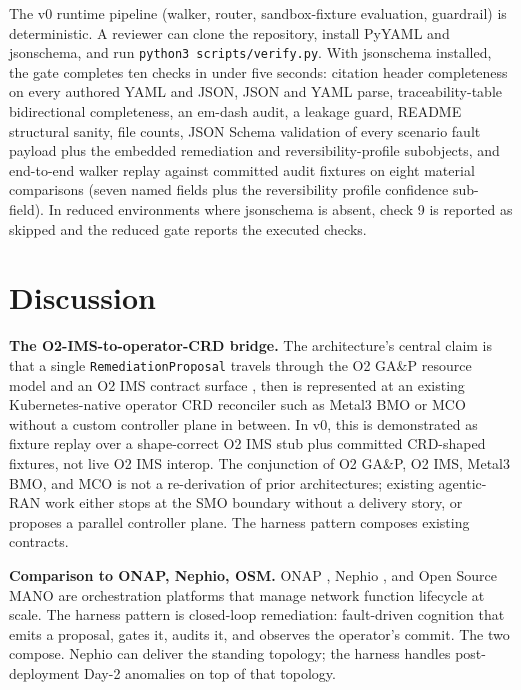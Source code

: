 \documentclass[twocolumn,10pt,a4paper]{article}
\begin{document}
The v0 runtime pipeline (walker, router, sandbox-fixture evaluation, guardrail) is deterministic. A reviewer can clone the repository, install PyYAML and jsonschema, and run \texttt{python3 scripts/verify.py}. With jsonschema installed, the gate completes ten checks in under five seconds: citation header completeness on every authored YAML and JSON, JSON and YAML parse, traceability-table bidirectional completeness, an em-dash audit, a leakage guard, README structural sanity, file counts, JSON Schema validation of every scenario fault payload plus the embedded remediation and reversibility-profile subobjects, and end-to-end walker replay against committed audit fixtures on eight material comparisons (seven named fields plus the reversibility profile confidence sub-field). In reduced environments where jsonschema is absent, check 9 is reported as skipped and the reduced gate reports the executed checks.

\section{Discussion}
\label{sec:discuss}

\textbf{The O2-IMS-to-operator-CRD bridge.} The architecture's central claim is that a single \texttt{RemediationProposal} travels through the O2 GA\&P resource model and an O2 IMS contract surface \cite{oran_o2_ganp,oran_o2_ims}, then is represented at an existing Kubernetes-native operator CRD reconciler such as Metal3 BMO or MCO \cite{metal3_bmo,openshift_mco} without a custom controller plane in between. In v0, this is demonstrated as fixture replay over a shape-correct O2 IMS stub plus committed CRD-shaped fixtures, not live O2 IMS interop. The conjunction of O2 GA\&P, O2 IMS, Metal3 BMO, and MCO is not a re-derivation of prior architectures; existing agentic-RAN work either stops at the SMO boundary without a delivery story, or proposes a parallel controller plane. The harness pattern composes existing contracts.

\textbf{Comparison to ONAP, Nephio, OSM.} ONAP \cite{onap}, Nephio \cite{nephio}, and Open Source MANO \cite{osm} are orchestration platforms that manage network function lifecycle at scale. The harness pattern is closed-loop remediation: fault-driven cognition that emits a proposal, gates it, audits it, and observes the operator's commit. The two compose. Nephio can deliver the standing topology; the harness handles post-deployment Day-2 anomalies on top of that topology.
\end{document}

